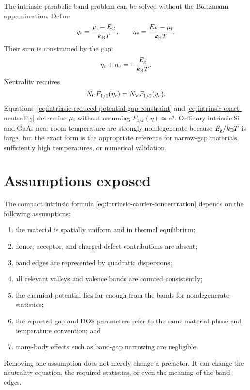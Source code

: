 The intrinsic parabolic-band problem can be solved without the Boltzmann
approximation.  Define
\begin{equation}
  \eta_c=\frac{\mu_{\mathrm i}-E_{\mathrm C}}{k_{\mathrm B} T},
  \qquad
  \eta_v=\frac{E_{\mathrm V}-\mu_{\mathrm i}}{k_{\mathrm B} T}.
  \label{eq:intrinsic-exact-reduced-potentials}
\end{equation}
Their sum is constrained by the gap:
\begin{equation}
  \eta_c+\eta_v=-\frac{E_{\mathrm g}}{k_{\mathrm B} T}.
  \label{eq:intrinsic-reduced-potential-gap-constraint}
\end{equation}
Neutrality requires
\begin{equation}
  N_{\mathrm C} F_{1/2}(\eta_c)
  =N_{\mathrm V} F_{1/2}(\eta_v).
  \label{eq:intrinsic-exact-neutrality}
\end{equation}
Equations~\eqref{eq:intrinsic-reduced-potential-gap-constraint} and
\eqref{eq:intrinsic-exact-neutrality} determine $\mu_{\mathrm i}$ without assuming
$F_{1/2}(\eta)\simeq e^\eta$.  Ordinary intrinsic Si and GaAs near room
temperature are strongly nondegenerate because $E_{\mathrm g}/k_{\mathrm B} T$ is large, but the
exact form is the appropriate reference for narrow-gap materials, sufficiently
high temperatures, or numerical validation.

\section{Assumptions exposed}

The compact intrinsic formula
\cref{eq:intrinsic-carrier-concentration} depends on the following assumptions:
\begin{enumerate}
  \item the material is spatially uniform and in thermal equilibrium;
  \item donor, acceptor, and charged-defect contributions are absent;
  \item band edges are represented by quadratic dispersions;
  \item all relevant valleys and valence bands are counted consistently;
  \item the chemical potential lies far enough from the bands for
        nondegenerate statistics;
  \item the reported gap and DOS parameters refer to the same material phase
        and temperature convention; and
  \item many-body effects such as band-gap narrowing are negligible.
\end{enumerate}
Removing one assumption does not merely change a prefactor.  It can change the
neutrality equation, the required statistics, or even the meaning of the band
edges.

